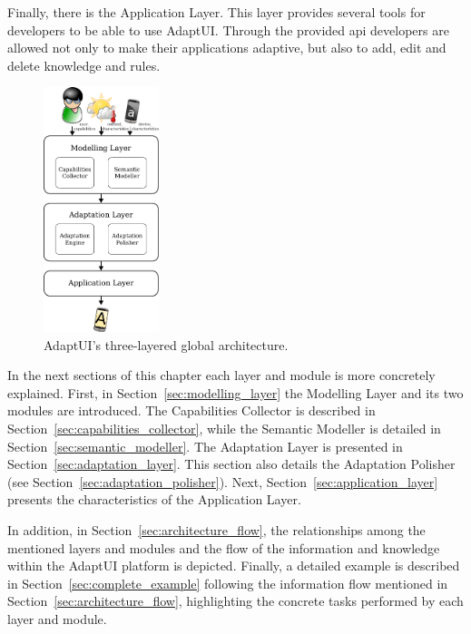 Finally, there is the Application Layer. This layer provides several tools for
developers to be able to use AdaptUI. Through the provided \ac{api} developers 
are allowed not only to make their applications adaptive, but also to add, edit 
and delete knowledge and rules.

\begin{figure}[H]
\centering
\includegraphics[width=0.30\textwidth]{architecture.pdf}
\caption{AdaptUI's three-layered global architecture.}
\label{fig:architecture}
\end{figure}

In the next sections of this chapter each layer and module is more concretely
explained. First, in Section~\ref{sec:modelling_layer} the Modelling Layer and
its two modules are introduced. The Capabilities Collector is described in
Section~\ref{sec:capabilities_collector}, while the Semantic Modeller is 
detailed in Section~\ref{sec:semantic_modeller}. The Adaptation Layer is 
presented in Section~\ref{sec:adaptation_layer}. This section also details the 
Adaptation Polisher (see Section~\ref{sec:adaptation_polisher}). Next,
Section~\ref{sec:application_layer} presents the characteristics of the 
Application Layer.

In addition, in Section~\ref{sec:architecture_flow}, the relationships among 
the mentioned layers and modules and the flow of the information and knowledge 
within the AdaptUI platform is depicted. Finally, a detailed example is
described in Section~\ref{sec:complete_example} following the information flow
mentioned in Section~\ref{sec:architecture_flow}, highlighting the concrete
tasks performed by each layer and module.



